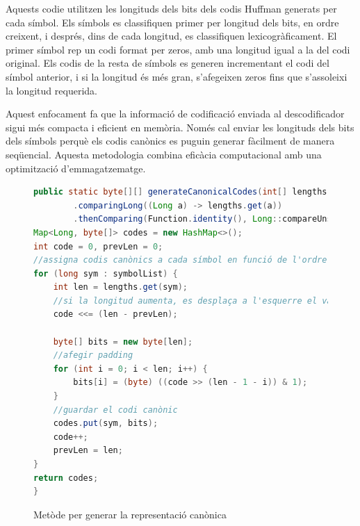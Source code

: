 \documentclass{ieeetj}
\begin{document}
Aquests codie \cite{CanonicalHuffman} utilitzen les longituds dels bits dels codis Huffman generats per cada símbol. Els símbols es classifiquen primer per longitud dels bits, en ordre creixent, i després, dins de cada longitud, es classifiquen lexicogràficament. El primer símbol rep un codi format per zeros, amb una longitud igual a la del codi original. Els codis de la resta de símbols  es generen incrementant el codi del símbol anterior, i si la longitud és més gran, s'afegeixen zeros fins que s'assoleixi la longitud requerida.\newline

Aquest enfocament fa que la informació de codificació enviada al descodificador sigui més compacta i eficient en memòria. Només cal enviar les longituds dels bits dels símbols perquè els codis canònics es puguin generar fàcilment de manera seqüencial. Aquesta metodologia combina eficàcia computacional amb una optimització d'emmagatzematge.

\begin{figure}[H]
\centering
\begin{lstlisting}[language=Java, basicstyle=\ttfamily\small, breaklines = true]
public static byte[][] generateCanonicalCodes(int[] lengths, symbolList.sort(Comparator
        .comparingLong((Long a) -> lengths.get(a))
        .thenComparing(Function.identity(), Long::compareUnsigned));
Map<Long, byte[]> codes = new HashMap<>();
int code = 0, prevLen = 0;
//assigna codis canònics a cada símbol en funció de l'ordre establert
for (long sym : symbolList) {
    int len = lengths.get(sym);
    //si la longitud aumenta, es desplaça a l'esquerre el valor de code
    code <<= (len - prevLen);

    byte[] bits = new byte[len];
    //afegir padding
    for (int i = 0; i < len; i++) {
        bits[i] = (byte) ((code >> (len - 1 - i)) & 1);
    }
    //guardar el codi canònic
    codes.put(sym, bits);
    code++;
    prevLen = len;
}
return codes;
}
\end{lstlisting}

\caption{Metòde per generar la representació canònica}
\label{fig:f1}
\end{figure}
\end{document}
